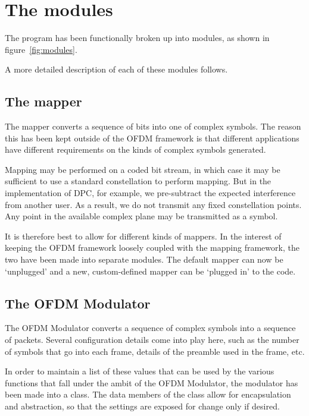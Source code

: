 \section{The modules}

The program has been functionally broken up into modules, as shown in
figure~\ref{fig:modules}.


A more detailed description of each of these modules follows.

\subsection{The mapper}

The mapper converts a sequence of bits into one of complex symbols. The reason
this has been kept outside of the OFDM framework is that different applications
have different requirements on the kinds of complex symbols generated.

Mapping may be performed on a coded bit stream, in which case it may be
sufficient to use a standard constellation to perform mapping. But in the
implementation of DPC, for example, we pre-subtract the expected interference
from another user. As a result, we do not transmit any fixed constellation
points. Any point in the available complex plane may be transmitted as a
symbol.

It is therefore best to allow for different kinds of mappers. In the interest
of keeping the OFDM framework loosely coupled with the mapping framework, the
two have been made into separate modules. The default mapper can now be
`unplugged' and a new, custom-defined mapper can be `plugged in' to the code.

\subsection{The OFDM Modulator}
\label{subsec:ofdm-modulator}

The OFDM Modulator converts a sequence of complex symbols into a sequence of
packets. Several configuration details come into play here, such as the number
of symbols that go into each frame, details of the preamble used in the frame,
etc.

In order to maintain a list of these values that can be used by the various
functions that fall under the ambit of the OFDM Modulator, the modulator has
been made into a class. The data members of the class allow for encapsulation
and abstraction, so that the settings are exposed for change only if desired.

